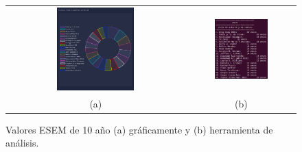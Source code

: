 \documentclass[a4paper, 12pt]{book}
\begin{document}
\begin{figure}[!h]
    \centering
    \begin{tabular}{cc}
    \includegraphics[width=0.45\textwidth]{img/esem_10_years_graph.png} &  
    \includegraphics[width=0.52\textwidth]{img/esem_10_years.png} \\ 
    (a) &(b) 
    \end{tabular}
    \caption{Valores ESEM de 10 año (a) gráficamente y (b) herramienta de análisis.}
    \label{fig:comp_esem_10_year}
\end{figure}
\end{document}

